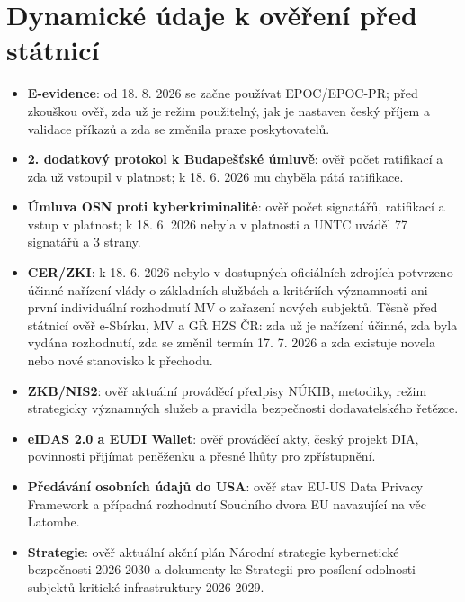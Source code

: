 \documentclass[11pt,a4paper]{article}
\begin{document}
\section*{Dynamické údaje k ověření před státnicí}
\begin{itemize}
  \item \textbf{E-evidence}: od 18. 8. 2026 se začne používat EPOC/EPOC-PR; před zkouškou ověř, zda už je režim použitelný, jak je nastaven český příjem a validace příkazů a zda se změnila praxe poskytovatelů.
  \item \textbf{2. dodatkový protokol k Budapešťské úmluvě}: ověř počet ratifikací a zda už vstoupil v platnost; k 18. 6. 2026 mu chyběla pátá ratifikace.
  \item \textbf{Úmluva OSN proti kyberkriminalitě}: ověř počet signatářů, ratifikací a vstup v platnost; k 18. 6. 2026 nebyla v platnosti a UNTC uváděl 77 signatářů a 3 strany.
  \item \textbf{CER/ZKI}: k 18. 6. 2026 nebylo v dostupných oficiálních zdrojích potvrzeno účinné nařízení vlády o základních službách a kritériích významnosti ani první individuální rozhodnutí MV o zařazení nových subjektů. Těsně před státnicí ověř e-Sbírku, MV a GŘ HZS ČR: zda už je nařízení účinné, zda byla vydána rozhodnutí, zda se změnil termín 17. 7. 2026 a zda existuje novela nebo nové stanovisko k přechodu.
  \item \textbf{ZKB/NIS2}: ověř aktuální prováděcí předpisy NÚKIB, metodiky, režim strategicky významných služeb a pravidla bezpečnosti dodavatelského řetězce.
  \item \textbf{eIDAS 2.0 a EUDI Wallet}: ověř prováděcí akty, český projekt DIA, povinnosti přijímat peněženku a přesné lhůty pro zpřístupnění.
  \item \textbf{Předávání osobních údajů do USA}: ověř stav EU-US Data Privacy Framework a případná rozhodnutí Soudního dvora EU navazující na věc Latombe.
  \item \textbf{Strategie}: ověř aktuální akční plán Národní strategie kybernetické bezpečnosti 2026-2030 a dokumenty ke Strategii pro posílení odolnosti subjektů kritické infrastruktury 2026-2029.
\end{itemize}
\end{document}
